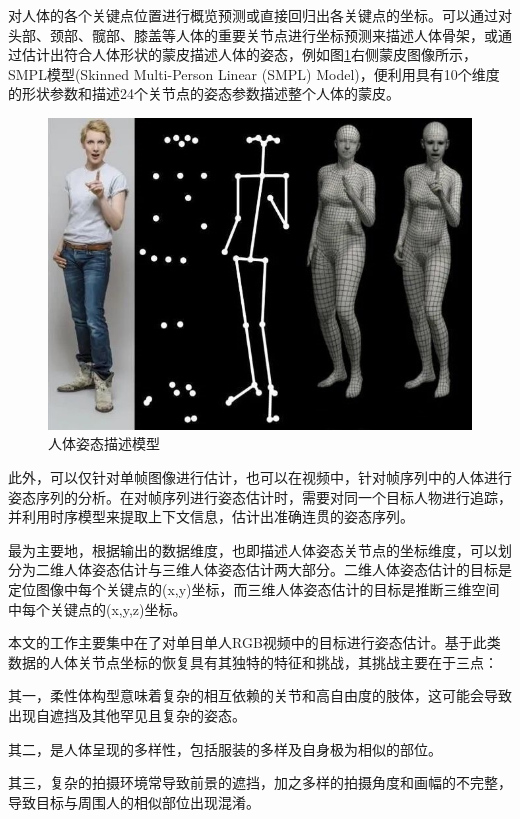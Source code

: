 对人体的各个关键点位置进行概览预测或直接回归出各关键点的坐标。可以通过对头部、颈部、髋部、膝盖等人体的重要关节点进行坐标预测来描述人体骨架，或通过估计出符合人体形状的蒙皮描述人体的姿态，例如图\ref{fig:f4}右侧蒙皮图像所示，SMPL模型(Skinned Multi-Person Linear (SMPL) Model)，便利用具有10个维度的形状参数和描述24个关节点的姿态参数描述整个人体的蒙皮。

\begin{figure}[h]
	\centering
	\includegraphics[scale=0.6]{figures/4.jpg}
	\caption{人体姿态描述模型}
	\label{fig:f4}
\end{figure}

此外，可以仅针对单帧图像进行估计，也可以在视频中，针对帧序列中的人体进行姿态序列的分析。在对帧序列进行姿态估计时，需要对同一个目标人物进行追踪，并利用时序模型来提取上下文信息，估计出准确连贯的姿态序列。

最为主要地，根据输出的数据维度，也即描述人体姿态关节点的坐标维度，可以划分为二维人体姿态估计与三维人体姿态估计两大部分。二维人体姿态估计的目标是定位图像中每个关键点的(x,y)坐标，而三维人体姿态估计的目标是推断三维空间中每个关键点的(x,y,z)坐标。

本文的工作主要集中在了对单目单人RGB视频中的目标进行姿态估计。基于此类数据的人体关节点坐标的恢复具有其独特的特征和挑战，其挑战主要在于三点：

其一，柔性体构型意味着复杂的相互依赖的关节和高自由度的肢体，这可能会导致出现自遮挡及其他罕见且复杂的姿态。

其二，是人体呈现的多样性，包括服装的多样及自身极为相似的部位。

其三，复杂的拍摄环境常导致前景的遮挡，加之多样的拍摄角度和画幅的不完整，导致目标与周围人的相似部位出现混淆。



